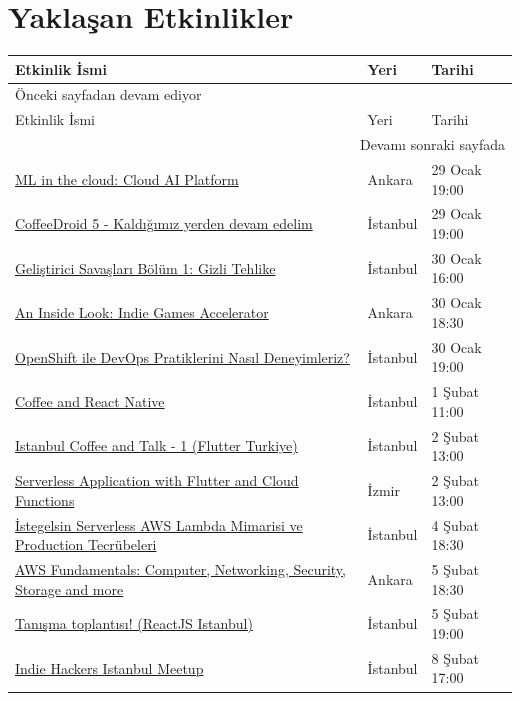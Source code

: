 \documentclass[11pt]{article}
\begin{document}
\section{Yaklaşan Etkinlikler}
\label{sec:org3454d88}
\begin{longtable}{|p{8cm}|l|l|}
\hline
Etkinlik İsmi & Yeri & Tarihi\\
\hline
\endfirsthead
\multicolumn{3}{l}{Önceki sayfadan devam ediyor} \\
\hline

Etkinlik İsmi & Yeri & Tarihi \\

\hline
\endhead
\hline\multicolumn{3}{r}{Devamı sonraki sayfada} \\
\endfoot
\endlastfoot
\hline
\href{https://www.meetup.com/Google-Cloud-Developer-Community-Ankara/events/268138124/}{ML in the cloud: Cloud AI Platform} & Ankara & 29 Ocak 19:00\\
\href{https://www.meetup.com/GDGIstanbul/events/268082538/}{CoffeeDroid 5 - Kaldığımız yerden devam edelim} & İstanbul & 29 Ocak 19:00\\
\href{https://www.meetup.com/TeknasyonLabs/events/268053933/}{Geliştirici Savaşları Bölüm 1: Gizli Tehlike} & İstanbul & 30 Ocak 16:00\\
\href{https://www.meetup.com/Facebook-Developer-Circle-Ankara/events/268055524/}{An Inside Look: Indie Games Accelerator} & Ankara & 30 Ocak 18:30\\
\href{https://www.meetup.com/IBMCloudTR/events/268163839/}{OpenShift ile DevOps Pratiklerini Nasıl Deneyimleriz?} & İstanbul & 30 Ocak 19:00\\
\href{https://www.meetup.com/Coffee-And-React-Native-\%25C4\%25B0stanbul/events/vzxzkrybcdbcb/}{Coffee and React Native} & İstanbul & 1 Şubat 11:00\\
\href{https://kommunity.com/flutter-turkiye/events/istanbul-coffee-and-talk}{Istanbul Coffee and Talk - 1 (Flutter Turkiye)} & İstanbul & 2 Şubat 13:00\\
\href{https://www.meetup.com/GDG-Cloud-Izmir/events/268107353/}{Serverless Application with Flutter and Cloud Functions} & İzmir & 2 Şubat 13:00\\
\href{https://kommunity.com/cloud-and-serverless-turkey/events/istegelsin-serverless-aws-lambda-mimarisi-ve-production-tecrubeleri}{İstegelsin Serverless AWS Lambda Mimarisi ve Production Tecrübeleri} & İstanbul & 4 Şubat 18:30\\
\href{https://kommunity.com/cloud-and-serverless-turkey/events/aws-fundamentals-computer-networking-security-storage-and-more-ankara}{AWS Fundamentals: Computer, Networking, Security, Storage and more} & Ankara & 5 Şubat 18:30\\
\href{https://kommunity.com/reactjs-istanbul/events/tanisma-toplantisi-first-meeting}{Tanışma toplantısı! (ReactJS Istanbul)} & İstanbul & 5 Şubat 19:00\\
\href{https://kommunity.com/indiehackers-istanbul-meetup/events/lets-meet-and-catch-a-little-up}{Indie Hackers Istanbul Meetup} & İstanbul & 8 Şubat 17:00\\
\hline
\end{longtable}
\end{document}

